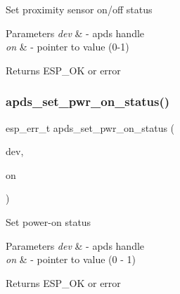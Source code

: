 \begin{DoxyItemize}
\item Set proximity sensor on/off status 
\end{DoxyItemize}


\begin{DoxyParams}{Parameters}
{\em dev} & -\/ apds handle \\
\hline
{\em on} & -\/ pointer to value (0-\/1) \\
\hline
\end{DoxyParams}
\begin{DoxyReturn}{Returns}
E\+S\+P\+\_\+\+OK or error 
\end{DoxyReturn}
\mbox{\label{group__APDS9960__SetStatusFunctions_gaea326b5abc9dca7faad2a137423bac3e}} 
\subsubsection{\texorpdfstring{apds\+\_\+set\+\_\+pwr\+\_\+on\+\_\+status()}{apds\_set\_pwr\_on\_status()}}
{\footnotesize\ttfamily esp\+\_\+err\+\_\+t apds\+\_\+set\+\_\+pwr\+\_\+on\+\_\+status (\begin{DoxyParamCaption}\item[{\hyperlink{structAPDS9960__Driver}{A\+P\+D\+S\+\_\+\+D\+EV}}]{dev,  }\item[{\hyperlink{vl53l0x__types_8h_aba7bc1797add20fe3efdf37ced1182c5}{uint8\+\_\+t} $\ast$}]{on }\end{DoxyParamCaption})}




\begin{DoxyItemize}
\item Set power-\/on status 
\end{DoxyItemize}


\begin{DoxyParams}{Parameters}
{\em dev} & -\/ apds handle \\
\hline
{\em on} & -\/ pointer to value (0 -\/ 1) \\
\hline
\end{DoxyParams}
\begin{DoxyReturn}{Returns}
E\+S\+P\+\_\+\+OK or error 
\end{DoxyReturn}
